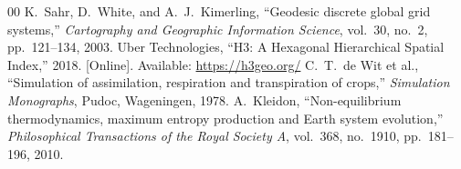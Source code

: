 \documentclass[10pt,journal,compsoc]{IEEEtran}
\begin{document}
\begin{thebibliography}{00}
K.~Sahr, D.~White, and A.~J.~Kimerling, ``Geodesic discrete global grid systems,'' \emph{Cartography and Geographic Information Science}, vol.~30, no.~2, pp.~121--134, 2003.
Uber Technologies, ``H3: A Hexagonal Hierarchical Spatial Index,'' 2018. [Online]. Available: \url{https://h3geo.org/}
C.~T.~de Wit et al., ``Simulation of assimilation, respiration and transpiration of crops,'' \emph{Simulation Monographs}, Pudoc, Wageningen, 1978.
A.~Kleidon, ``Non-equilibrium thermodynamics, maximum entropy production and Earth system evolution,'' \emph{Philosophical Transactions of the Royal Society A}, vol.~368, no.~1910, pp.~181--196, 2010.
\end{thebibliography}
\end{document}
